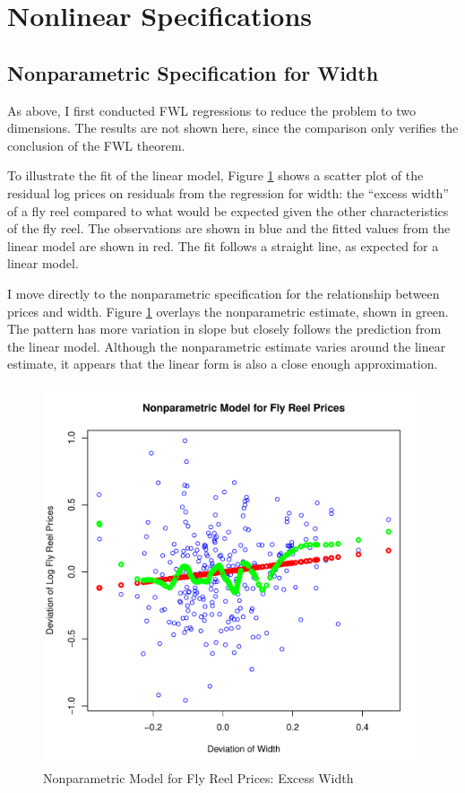 \clearpage
\section{Nonlinear Specifications}


\subsection{Nonparametric Specification for Width}

As above, I first conducted FWL regressions 
to reduce the problem to two dimensions. 
The results are not shown here, 
since the comparison only verifies 
the conclusion of the FWL theorem. 

To illustrate the fit of the linear model, 
Figure \ref{fig:dev_np_vs_width_dev} 
shows a scatter plot 
of the residual log prices on 
residuals from the regression for 
width:
the ``excess width'' of a fly reel 
compared to what would be 
expected given the other characteristics of the fly reel. 
The observations are shown in blue
and the fitted values from the linear model are shown in red.
The fit follows a straight line, as expected for a linear model. 

% 
I move directly to the nonparametric specification for 
the relationship between prices and 
width.
Figure \ref{fig:dev_np_vs_width_dev} 
overlays the nonparametric estimate, shown in green. 
The pattern has more variation in slope but 
closely follows the prediction from the linear model. 
Although the nonparametric estimate varies around the linear estimate,
it appears that the linear form
is also a close enough approximation.


\begin{figure}[h!]
  \centering
  \includegraphics[scale = 0.5, keepaspectratio=true]{../Figures/dev_np_vs_width_dev}
  \caption{Nonparametric Model for Fly Reel Prices: Excess Width} \label{fig:dev_np_vs_width_dev}
\end{figure}



